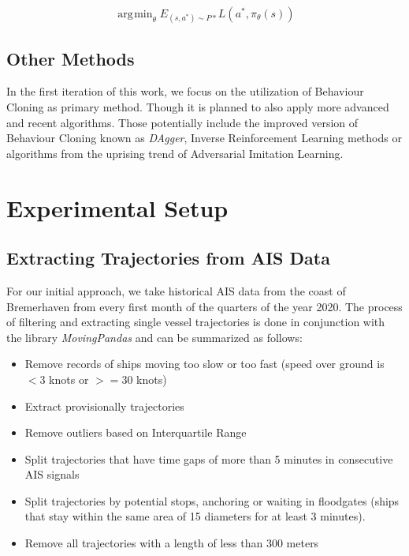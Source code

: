 \documentclass[conference]{IEEEtran}
\DeclareMathOperator*{\argmin}{\arg\!\min}
\begin{document}
\begin{equation}
\argmin_\theta E_{(s,a^*) \sim P*} L(a^*, \pi_\theta(s))
\end{equation}

\subsection{Other Methods}
In the first iteration of this work, we focus on the utilization of Behaviour Cloning as primary method. Though it is planned to also apply more advanced and recent algorithms. Those potentially include the improved version of Behaviour Cloning known as \textit{DAgger}\cite{ross2011reduction}, Inverse Reinforcement Learning methods or algorithms from the uprising trend of Adversarial Imitation Learning.

\section{Experimental Setup}
\subsection{Extracting Trajectories from AIS Data}
For our initial approach, we take historical AIS data from the coast of Bremerhaven from every first month of the quarters of the year 2020. The process of filtering and extracting single vessel trajectories is done in conjunction with the library \textit{MovingPandas}\cite{graser2019movingpandas} and can be summarized as follows:

\begin{itemize}
    \item Remove records of ships moving too slow or too fast (speed over ground is $<3$ knots or $>=30$ knots)
    \item Extract provisionally trajectories
    \item Remove outliers based on Interquartile Range
    \item Split trajectories that have time gaps of more than 5 minutes in consecutive AIS signals
    \item Split trajectories by potential stops, anchoring or waiting in floodgates (ships that stay within the same area of 15 diameters for at least 3 minutes).
    \item Remove all trajectories with a length of less than 300 meters
\end{itemize}
\end{document}
